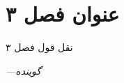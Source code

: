 \chapter{عنوان فصل ۳}
\setlength{\epigraphwidth}{0.85\textwidth}
\epigraph{نقل قول فصل ۳}{\textit{—گوینده}}
\setcounter{footnote}{0}
